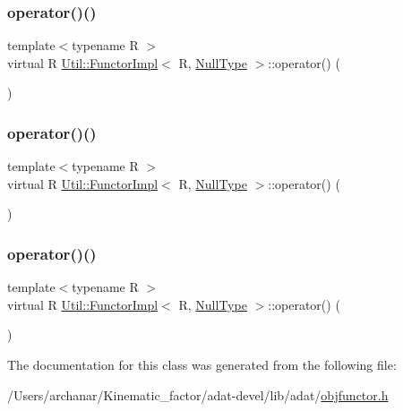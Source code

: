 \subsubsection{\texorpdfstring{operator()()}{operator()()}\hspace{0.1cm}{\footnotesize\ttfamily [1/3]}}
{\footnotesize\ttfamily template$<$typename R $>$ \\
virtual R \mbox{\hyperlink{classUtil_1_1FunctorImpl}{Util\+::\+Functor\+Impl}}$<$ R, \mbox{\hyperlink{classUtil_1_1NullType}{Null\+Type}} $>$\+::operator() (\begin{DoxyParamCaption}{ }\end{DoxyParamCaption})\hspace{0.3cm}{\ttfamily [pure virtual]}}

\mbox{\label{classUtil_1_1FunctorImpl_3_01R_00_01NullType_01_4_a91bac1d58b637b1b4bd5e5da7ebb8c82}} 
\subsubsection{\texorpdfstring{operator()()}{operator()()}\hspace{0.1cm}{\footnotesize\ttfamily [2/3]}}
{\footnotesize\ttfamily template$<$typename R $>$ \\
virtual R \mbox{\hyperlink{classUtil_1_1FunctorImpl}{Util\+::\+Functor\+Impl}}$<$ R, \mbox{\hyperlink{classUtil_1_1NullType}{Null\+Type}} $>$\+::operator() (\begin{DoxyParamCaption}{ }\end{DoxyParamCaption})\hspace{0.3cm}{\ttfamily [pure virtual]}}

\mbox{\label{classUtil_1_1FunctorImpl_3_01R_00_01NullType_01_4_a91bac1d58b637b1b4bd5e5da7ebb8c82}} 
\subsubsection{\texorpdfstring{operator()()}{operator()()}\hspace{0.1cm}{\footnotesize\ttfamily [3/3]}}
{\footnotesize\ttfamily template$<$typename R $>$ \\
virtual R \mbox{\hyperlink{classUtil_1_1FunctorImpl}{Util\+::\+Functor\+Impl}}$<$ R, \mbox{\hyperlink{classUtil_1_1NullType}{Null\+Type}} $>$\+::operator() (\begin{DoxyParamCaption}{ }\end{DoxyParamCaption})\hspace{0.3cm}{\ttfamily [pure virtual]}}



The documentation for this class was generated from the following file\+:\begin{DoxyCompactItemize}
\item 
/\+Users/archanar/\+Kinematic\+\_\+factor/adat-\/devel/lib/adat/\mbox{\hyperlink{adat-devel_2lib_2adat_2objfunctor_8h}{objfunctor.\+h}}\end{DoxyCompactItemize}
